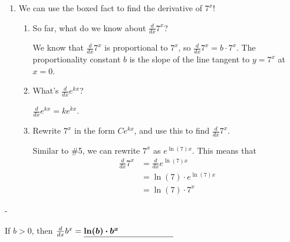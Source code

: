 \documentclass{article}
\makeatletter
\newlength{\tipmargin}
\renewenvironment{framed}{
  \setlength{\tipmargin}{\textwidth-\linewidth}
  \advance\@totalleftmargin-\tipmargin
  \def\FrameCommand{\hspace{\tipmargin}\fbox}%
  \advance\linewidth\tipmargin
  \MakeFramed {\advance\hsize-\width \FrameRestore}%
}
{\endMakeFramed}
\makeatother
\begin{document}
\begin{enumerate}[resume]
\item  We can use the boxed fact to find the derivative of $7^x$!

  \begin{enumerate}
  \item
    \begin{problem}
      So far, what do we know about $\frac{d}{dx} 7^x$?   
      \vfill
    \end{problem}

    \begin{solution}
      We know that $\frac{d}{dx} 7^x$ is proportional to
      $7^x$, so $\frac{d}{dx} 7^x = b \cdot 7^x$. The proportionality constant $b$ is the slope
      of the line tangent to $y=7^x$ at $x=0$. 
    \end{solution}

  \item
    \begin{problem}
      What's $\frac{d}{dx} e^{kx}$?
      \vfill
    \end{problem}

    \begin{solution}
      $\frac{d}{dx} e^{kx} = ke^{kx}$.
    \end{solution}

  \item    
    \begin{problem}[\nstretch{1.25}]
      Rewrite $7^x$ in the form $C e^{kx}$, and use this to find $\frac{d}{dx} 7^{x} $.
      \vfill 
    \end{problem}

    \begin{solution}
      Similar to \#5, we can rewrite $7^x$ as $e^{\ln(7)x}$.
      This means that
      \begin{align*}
        \frac{d}{dx} 7^x &= \frac{d}{dx} e^{\ln(7)x} \\
        &= \ln(7) \cdot e^{\ln(7)x}\\
        &= \ln(7) \cdot 7^x
      \end{align*}
    \end{solution}

  \end{enumerate}

\end{enumerate}
\begin{framed}
  If $b > 0$, then
  $\frac{d}{dx} b^x = 
  \fitb[\vphantom{\dfrac{1}{1}}]{1.5in}{\ln(b) \cdot b^x}$
\end{framed}
\end{document}

